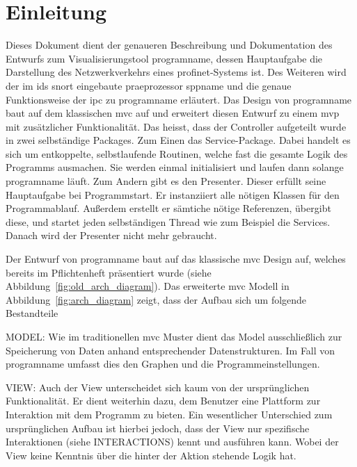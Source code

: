 \chapter{Einleitung}
Dieses Dokument dient der genaueren Beschreibung und Dokumentation des Entwurfs zum Visualisierungstool \gls{programname}, dessen Hauptaufgabe die Darstellung des Netzwerkverkehrs eines \gls{profinet}-Systems ist. Des Weiteren wird der im \gls{ids} \gls{snort} eingebaute \gls{praeprozessor} \gls{sppname} und die genaue Funktionsweise der \gls{ipc} zu \gls{programname} erläutert.\newline
\newline
Das Design von \gls{programname} baut auf dem klassischen \gls{mvc} auf und erweitert diesen Entwurf zu einem \gls{mvp} mit zusätzlicher Funktionalität. Das heisst, dass der Controller aufgeteilt wurde in zwei selbständige Packages. Zum Einen das Service-Package. Dabei handelt es sich um entkoppelte, selbstlaufende Routinen, welche fast die gesamte Logik des Programms ausmachen. Sie werden einmal initialisiert und laufen dann solange \gls{programname} läuft. Zum Andern gibt es den Presenter. Dieser erfüllt seine Hauptaufgabe bei Programmstart. Er instanziiert alle nötigen Klassen für den Programmablauf. Außerdem erstellt er sämtiche nötige Referenzen, übergibt diese, und startet jeden selbständigen Thread wie zum Beispiel die Services. Danach wird der Presenter nicht mehr gebraucht.

Der Entwurf von \gls{programname} baut auf das klassische \gls{mvc} Design auf, welches bereits im Pflichtenheft präsentiert wurde (siehe Abbildung~\ref{fig:old_arch_diagram}). Das erweiterte \gls{mvc} Modell in Abbildung~\ref{fig:arch_diagram} zeigt, dass der Aufbau sich um folgende Bestandteile

MODEL:
Wie im traditionellen \gls{mvc} Muster dient das Model ausschließlich zur Speicherung von Daten anhand entsprechender Datenstrukturen. Im Fall von \gls{programname} umfasst dies den Graphen und die Programmeinstellungen.

VIEW:
Auch der View unterscheidet sich kaum von der ursprünglichen Funktionalität. Er dient weiterhin dazu, dem Benutzer eine Plattform zur Interaktion mit dem Programm zu bieten. Ein wesentlicher Unterschied zum ursprünglichen Aufbau ist hierbei jedoch, dass der View nur spezifische Interaktionen (siehe INTERACTIONS) kennt und ausführen kann. Wobei der View keine Kenntnis über die hinter der Aktion stehende Logik hat. 

